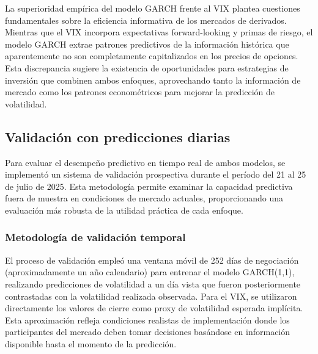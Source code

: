La superioridad empírica del modelo GARCH frente al VIX plantea cuestiones fundamentales sobre la eficiencia informativa de los mercados de derivados. Mientras que el VIX incorpora expectativas forward-looking y primas de riesgo, el modelo GARCH extrae patrones predictivos de la información histórica que aparentemente no son completamente capitalizados en los precios de opciones. Esta discrepancia sugiere la existencia de oportunidades para estrategias de inversión que combinen ambos enfoques, aprovechando tanto la información de mercado como los patrones econométricos para mejorar la predicción de volatilidad.

\subsection{Validación con predicciones diarias}

Para evaluar el desempeño predictivo en tiempo real de ambos modelos, se implementó un sistema de validación prospectiva durante el período del 21 al 25 de julio de 2025. Esta metodología permite examinar la capacidad predictiva fuera de muestra en condiciones de mercado actuales, proporcionando una evaluación más robusta de la utilidad práctica de cada enfoque.

\subsubsection{Metodología de validación temporal}

El proceso de validación empleó una ventana móvil de 252 días de negociación (aproximadamente un año calendario) para entrenar el modelo GARCH(1,1), realizando predicciones de volatilidad a un día vista que fueron posteriormente contrastadas con la volatilidad realizada observada. Para el VIX, se utilizaron directamente los valores de cierre como proxy de volatilidad esperada implícita. Esta aproximación refleja condiciones realistas de implementación donde los participantes del mercado deben tomar decisiones basándose en información disponible hasta el momento de la predicción.

